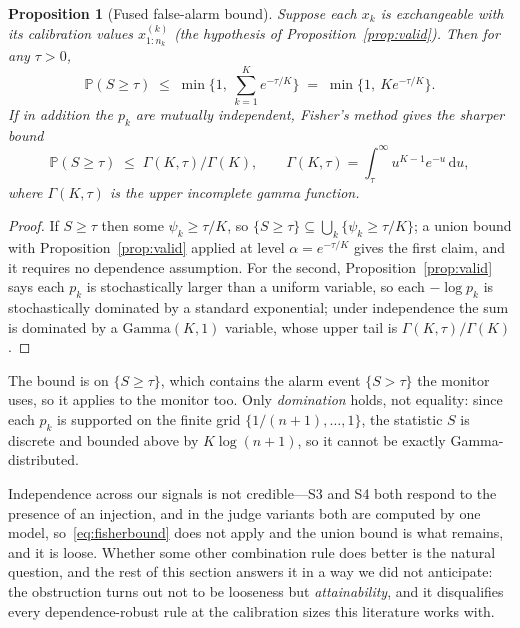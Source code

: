 \documentclass[pdflatex,sn-basic]{sn-jnl}%
\theoremstyle{thmstyleone}
\newtheorem{proposition}[theorem]{Proposition}
\theoremstyle{thmstyletwo}
\theoremstyle{thmstylethree}
\newcommand{\Prob}{\mathbb{P}}
\begin{document}
\begin{proposition}[Fused false-alarm bound]\label{prop:fusebound}
Suppose each $x_k$ is exchangeable with its calibration values
$x^{(k)}_{1:n_k}$ (the hypothesis of Proposition~\ref{prop:valid}). Then for any
$\tau > 0$,
\begin{equation}
\Prob(S \ge \tau) \;\le\; \min\Big\{1,\ \sum_{k=1}^{K} e^{-\tau/K} \Big\}
\;=\; \min\{1,\ K e^{-\tau/K}\}.
\end{equation}
If in addition the $p_k$ are mutually independent, Fisher's method gives the
sharper bound
\begin{equation}\label{eq:fisherbound}
\Prob(S \ge \tau) \;\le\; \Gamma(K,\tau)/\Gamma(K),
\qquad
\Gamma(K,\tau) = \int_\tau^\infty u^{K-1}e^{-u}\,\mathrm{d}u ,
\end{equation}
where $\Gamma(K,\tau)$ is the upper incomplete gamma function.
\end{proposition}

\begin{proof}
If $S \ge \tau$ then some $\psi_k \ge \tau/K$, so
$\{S \ge \tau\} \subseteq \bigcup_k \{\psi_k \ge \tau/K\}$; a union bound with
Proposition~\ref{prop:valid} applied at level $\alpha = e^{-\tau/K}$ gives the
first claim, and it requires no dependence assumption. For the second,
Proposition~\ref{prop:valid} says each $p_k$ is stochastically larger than a
uniform variable, so each $-\log p_k$ is stochastically dominated by a standard
exponential; under independence the sum is dominated by a $\mathrm{Gamma}(K,1)$
variable, whose upper tail is $\Gamma(K,\tau)/\Gamma(K)$.
\end{proof}

The bound is on $\{S \ge \tau\}$, which contains the alarm event $\{S > \tau\}$ the
monitor uses, so it applies to the monitor too.
Only \emph{domination} holds, not equality: since each $p_k$ is supported on the
finite grid $\{1/(n{+}1),\dots,1\}$, the statistic $S$ is discrete and bounded
above by $K\log(n{+}1)$, so it cannot be exactly Gamma-distributed.

Independence across our signals is not credible---S3 and S4 both respond to the
presence of an injection, and in the judge variants both are computed by one
model, so~\eqref{eq:fisherbound} does not apply and the union bound is what
remains, and it is loose. Whether some other combination rule does better is
the natural question, and the rest of this section answers it in a way we did not
anticipate: the obstruction turns out not to be looseness but
\emph{attainability}, and it disqualifies every dependence-robust rule at the
calibration sizes this literature works with.
\end{document}
